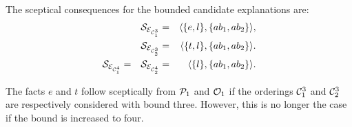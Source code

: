 \begin{tcolorbox}
\begin{example}
The sceptical consequences for the bounded candidate explanations are: 
\[
\begin{aligned}
&&\mathcal{S}_{\mathcal{E}_{\mathcal{C}_1^3}}  & =& \langle \{e, l\}, \{ab_1, ab_2\} \rangle, \\
&&\mathcal{S}_{\mathcal{E}_{\mathcal{C}_2^3}} & =&  \langle \{t, l\}, \{ab_1, ab_2\} \rangle. \\
\mathcal{S}_{\mathcal{E}_{\mathcal{C}_1^4}} &=& \mathcal{S}_{\mathcal{E}_{\mathcal{C}_2^4}} &=&  \langle \{l\}, \{ab_1, ab_2\} \rangle.
\end{aligned}
\]

The facts $e$ and $t$ follow sceptically from $\mathcal{P}_1$ and $\mathcal{O}_1$ if the orderings $\mathcal{C}_1^3$ and $\mathcal{C}_2^3$ are respectively considered with bound three. However, this is no longer the case if the bound is increased to four.
\end{example}
\end{tcolorbox}
\vspace*{\fill}
\newpage
